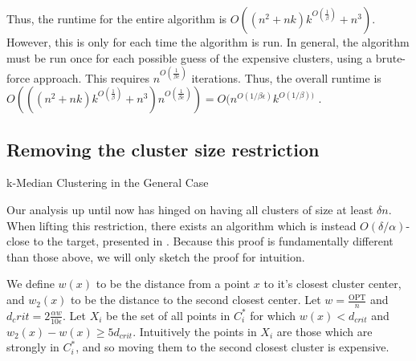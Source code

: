 \documentclass[paper=a4, fontsize=10.5pt]{scrartcl} %
\makeatletter
\numberwithin{equation}{section} %
\numberwithin{figure}{section} %
\numberwithin{table}{section} %
\def\BState{\State\hskip-\ALG@thistlm}
\makeatother
\begin{document}
Thus, the runtime for the entire algorithm is $O((n^2 + nk)k^{O(\frac{1}{\beta})} + n^3)$.  However, this is only for each time the algorithm is run.  In general, the algorithm must be run once for each possible guess of the expensive clusters, using a brute-force approach.  This requires $n^{O(\frac{1}{\beta e})}$ iterations.  Thus, the overall runtime is $O(((n^2 + nk)k^{O(\frac{1}{\beta})}+n^3)n^{O(\frac{1}{\beta e})}) = O(n^{O(1/\beta\epsilon)}k^{O(1/\beta))}$ .

\subsection{Removing the cluster size restriction}

\begin{algorithm}
\caption{k-Median Clustering in the General Case}\label{alg:cluster2}
\end{algorithm}

Our analysis up until now has hinged on having all clusters of size at least $\delta n$. When lifting this restriction, there exists an algorithm which is instead $O(\delta/\alpha)$-close to the target, presented in \cite{firstpaper}. Because this proof is fundamentally different than those above, we will only sketch the proof for intuition. 

We define $w(x)$ to be the distance from a point $x$ to it's closest cluster center, and $w_2(x)$ to be the distance to the second closest center. Let $w = \frac{\text{OPT}}{n}$ and $d_crit = 2\frac{\alpha w}{10 \epsilon}$. Let $X_i$ be the set of all points in $C_i^*$ for which $w(x) < d_{crit}$ and $w_2(x) - w(x) \geq 5d_{crit}$. Intuitively the points in $X_i$ are those which are strongly in $C_i^*$, and so moving them to the second closest cluster is expensive.
\end{document}
